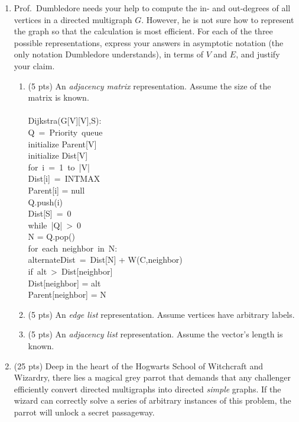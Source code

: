 \documentclass[12pt]{article}
\newcommand\tab[1][1cm]{\hspace*{#1}}
\begin{document}
\begin{enumerate}
\item Prof.\ Dumbledore needs your help to compute the in- and out-degrees of all vertices in a directed multigraph $G$. However, he is not sure how to represent the graph so that the calculation is most efficient. For each of the three possible representations, express your answers in asymptotic notation (the only notation Dumbledore understands), in terms of $V$ and $E$, and justify your claim.
\begin{enumerate}
\item \label{3a} (5 pts) An {\em adjacency matrix} representation. Assume the size of the matrix is known.
\\
\\
Dijkstra(G[V][V],S):\\
\tab Q~=~Priority~queue\\
\tab initialize Parent[V]\\
\tab initialize Dist[V]\\
\tab for~i~=~1~to~|V|\\
\tab \tab Dist[i]~=~INTMAX\\
\tab \tab Parent[i] = null\\
\tab \tab Q.push(i)\\
\tab Dist[S]~=~0\\
\tab while~|Q|~>~0\\
\tab \tab N = Q.pop()\\
\tab \tab for~each~neighbor~in~N:\\
\tab \tab \tab alternateDist~=~Dist[N] + W(C,neighbor)\\
\tab \tab \tab if~alt~\textgreater~Dist[neighbor]\\
\tab \tab \tab \tab Dist[neighbor] = alt\\
\tab \tab \tab \tab Parent[neighbor] = N\\
\pagebreak
\item \label{3b} (5 pts) An {\em edge list} representation. Assume vertices have arbitrary labels.
\pagebreak
\item \label{3c} (5 pts) An {\em adjacency list} representation. Assume the vector's length is known.
\pagebreak
\end{enumerate}


\item \label{4} (25 pts) Deep in the heart of the Hogwarts School of Witchcraft and
Wizardry, there lies a magical grey parrot that demands that any challenger
efficiently convert directed multigraphs into directed \emph{simple}
graphs. If the wizard can correctly solve a series of arbitrary
instances of this problem, the parrot will unlock a secret passageway. 


\end{enumerate}
\end{document}
